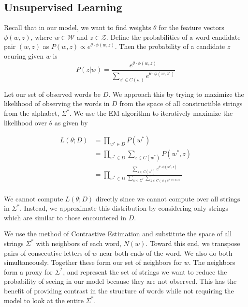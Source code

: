 \documentclass[11pt,twocolumn]{article}
\begin{document}
\subsection{Unsupervised Learning}
Recall that in our model, we want to find weights $\theta$ for the feature vectors $\phi(w,z)$, where $w\in\mathcal W$ and $z\in\mathcal Z$. Define the probabilities of a word-candidate pair $(w,z)$ as $P(w,z)\propto e^{\theta\cdot\phi(w,z)}$. Then the probability of a candidate $z$ ocuring given $w$ is
\begin{equation}
    \label{equ:prob_par}
    P(z|w) = \frac{e^{\theta\cdot\phi(w,z)}} {\sum_{z'\in C(w)} e^{\theta\cdot\phi(w,z')}}
\end{equation}

Let our set of observed words be $D$. We approach this by trying to maximize the likelihood of observing the words in $D$ from the space of all constructible strings from the alphabet, $\Sigma^*$. We use the EM-algorithm to iteratively maximize the likelihood over $\theta$ as given by

\begin{equation}
    \begin{split}
        L(\theta; D) &= \prod_{w^*\in D} P(w^*) \\
        &= \prod_{w^*\in D} \sum_{z\in C(w^*)} P(w^*, z) \\
        &= \prod_{w^*\in D} \frac{\sum_{z\in C(w^*)} e^{\theta\cdot\phi(w^*,z)}} {\sum_{w\in\Sigma^*}\sum_{z\in C(w) e^{\theta\cdot\phi(w,z)}}} \\
    \end{split}
\end{equation}

We cannot compute $L(\theta; D)$ directly since we cannot compute over all strings in $\Sigma^*$. Instead, we approximate this distribution by considering only strings which are similar to those encountered in $D$.

We use the method of Contrastive Estimation \citep{Smith05} and substitute the space of all strings $\Sigma^*$ with neighbors of each word, $N(w)$. Toward this end, we transpose pairs of consecutive letters of $w$ near both ends of the word. We also do both simultaneously. Together these form our set of neighbors for $w$. The neighbors form a proxy for $\Sigma^*$, and represent the set of strings we want to reduce the probability of seeing in our model because they are not observed. This has the benefit of providing contrast in the structure of words while not requiring the model to look at the entire $\Sigma^*$.
\end{document}
